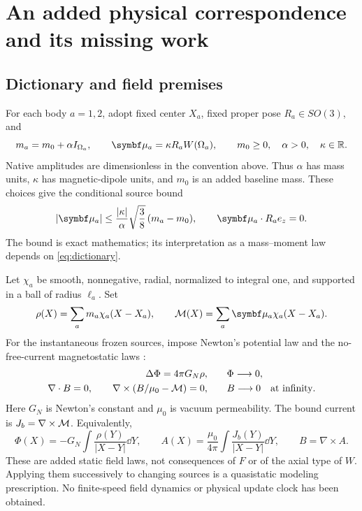 \section{An added physical correspondence and its missing work}\label{sec:fields}
\subsection{Dictionary and field premises}
For each body \(a=1,2\), adopt fixed center \(X_a\), fixed proper pose \(R_a\in SO(3)\), and
\begin{equation}
 m_a=m_0+\alpha I_{\Om_a},\qquad \mub_a=\kappa R_aW(\Om_a),
 \qquad m_0\ge0,\quad \alpha>0,\quad \kappa\in\R.
 \label{eq:dictionary}
\end{equation}
Native amplitudes are dimensionless in the convention above. Thus \(\alpha\) has mass units, \(\kappa\) has magnetic-dipole units, and \(m_0\) is an added baseline mass. These choices give the conditional source bound
\begin{equation}
 |\mub_a|\le \frac{|\kappa|}{\alpha}\sqrt{\frac38}\,(m_a-m_0),
 \qquad \mub_a\cdot R_ae_z=0. \label{eq:source-bound}
\end{equation}
The bound is exact mathematics; its interpretation as a mass--moment law depends on \eqref{eq:dictionary}.

Let \(\chi_a\) be smooth, nonnegative, radial, normalized to integral one, and supported in a ball of radius \(\ell_a\). Set
\[
 \rho(X)=\sum_a m_a\chi_a(X-X_a),\qquad
 \Mmag(X)=\sum_a\mub_a\chi_a(X-X_a).
\]
For the instantaneous frozen sources, impose Newton's potential law \cite{TongG} and the no-free-current magnetostatic laws \cite{TongM,TongMatter}:
\begin{align}
 \Delta\Phi=4\pi G_N\rho,\qquad &\Phi\longrightarrow0, \label{eq:gravity-field}\\
 \nabla\cdot B=0,\qquad
 \nabla\times(B/\mu_0-\mathcal M)=0,\qquad &B\longrightarrow0
 \quad\text{at infinity}. \label{eq:mag-field}
\end{align}
Here \(G_N\) is Newton's constant and \(\mu_0\) is vacuum permeability. The bound current is \(J_b=\nabla\times\mathcal M\). Equivalently,
\[
 \Phi(X)=-G_N\int\frac{\rho(Y)}{|X-Y|}\dd Y,\qquad
 A(X)=\frac{\mu_0}{4\pi}\int\frac{J_b(Y)}{|X-Y|}\dd Y,\qquad B=\nabla\times A.
\]
These are added static field laws, not consequences of \(F\) or of the axial type of \(W\). Applying them successively to changing sources is a quasistatic modeling prescription. No finite-speed field dynamics or physical update clock has been obtained.


